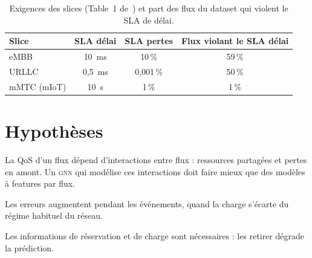 \documentclass[11pt,a4paper]{report}
\newcommand{\gnn}{\textsc{gnn}}
\begin{document}
\begin{table}[H]
\centering\small
\begin{tabular}{@{}lccc@{}}
\toprule
Slice & SLA délai & SLA pertes & Flux violant le SLA délai\\
\midrule
eMBB & 10~ms & 10\,\% & 59\,\%\\
URLLC & 0,5~ms & 0,001\,\% & 50\,\%\\
mMTC (mIoT) & 10~s & 1\,\% & 1\,\%\\
\bottomrule
\end{tabular}
\caption{Exigences des slices (Table~1 de~\cite{farreras}) et part des flux du dataset qui violent le SLA de délai.}
\label{tab:sla_def}
\end{table}

\section{Hypothèses}
\begin{description}[nosep]
  \item[H1] La QoS d'un flux dépend d'interactions entre flux : ressources partagées et pertes en amont. Un \gnn{} qui modélise ces interactions doit faire mieux que des modèles à features par flux.
  \item[H2] Les erreurs augmentent pendant les événements, quand la charge s'écarte du régime habituel du réseau.
  \item[H3] Les informations de réservation et de charge sont nécessaires : les retirer dégrade la prédiction.
\end{description}
\end{document}

